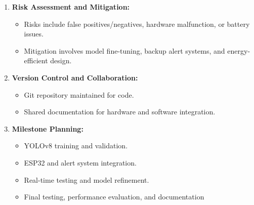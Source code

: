 \documentclass[a4paper, 12pt]{report}
\begin{document}
\begin{enumerate}[itemsep=-4pt, label=\textbf{\roman*.}]
\begin{itemize}[itemsep=-4pt]
\begin{itemize}
            \item \textbf{Phase 4: Live Video Testing}
            \vspace{-4pt}
            \begin{itemize}
                \item Real-time detection with live camera feeds.
                \item Dual-camera simultaneous operation testing.
                \item Alert latency measurement (detection → ESP32 trigger time).
                \item System stability testing (continuous 1-hour+ operation).
                \item Edge case testing: occlusion, distance variation, lighting changes.
            \end{itemize}
        \end{itemize}
    \end{itemize}

    \item \textbf{Risk Assessment and Mitigation: }
    \vspace{-4pt}
    \begin{itemize}[itemsep=-4pt]
        \item Risks include false positives/negatives, hardware malfunction, or battery issues.
        \item Mitigation involves model fine-tuning, backup alert systems, and energy-efficient design.
    \end{itemize}

    \item \textbf{Version Control and Collaboration: }
    \vspace{-4pt}
    \begin{itemize}[itemsep=-4pt]
        \item Git repository maintained for code.
        \item Shared documentation for hardware and software integration.
    \end{itemize}

    \item \textbf{Milestone Planning: }
    \vspace{-4pt}
    \begin{itemize}[itemsep=-4pt]
        \item YOLOv8 training and validation.
        \item ESP32 and alert system integration.
        \item Real-time testing and model refinement.
        \item Final testing, performance evaluation, and documentation
    \end{itemize}
\end{enumerate}
\end{document}
